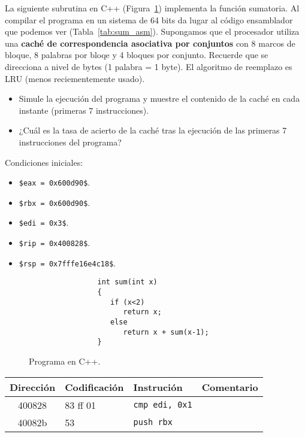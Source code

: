 \documentclass[12pt]{article}
\begin{document}
    \begin{ejercicio}[1.25 puntos]
        La siguiente subrutina en C++ (Figura~\ref{sum_c}) implementa la función sumatoria. Al compilar el programa en un sistema de 64 bits da lugar al código ensamblador que podemos ver (Tabla~\ref{tab:sum_asm}). Supongamos que el procesador utiliza una \textbf{caché de correspondencia asociativa por conjuntos} con 8 marcos de bloque, 8 palabras por bloqe y 4 bloques por conjunto. Recuerde que se direcciona a nivel de bytes (1 palabra = 1 byte). El algoritmo de reemplazo es LRU (menos reciementemente usado).
        \begin{itemize}
            \item Simule la ejecución del programa y muestre el contenido de la caché en cada instante (primeras 7 instrucciones).
            \item ¿Cuál es la tasa de acierto de la caché tras la ejecución de las primeras 7 instrucciones del programa?
        \end{itemize}
        Condiciones iniciales:
        \begin{itemize}
            \item \verb|$eax = 0x600d90$|.
            \item \verb|$rbx = 0x600d90$|.
            \item \verb|$edi = 0x3$|.
            \item \verb|$rip = 0x400828$|.
            \item \verb|$rsp = 0x7fffe16e4c18$|.
        \end{itemize}
        \begin{figure}[H]
            \begin{verbatim}
                int sum(int x)
                {
                   if (x<2)
                      return x;
                   else
                      return x + sum(x-1);
                }
            \end{verbatim}
            \caption{Programa en C++.}
            \label{sum_c}
        \end{figure}
        \begin{table}[H]
        \centering
        \begin{tabular}{|c|l|l|l|}
            \hline
            Dirección & Codificación & Instrución & Comentario \\
            \hline
            400828 & 83 ff 01 & \verb|cmp edi, 0x1| & \\
            \hline
            40082b & 53 & \verb|push rbx| & \\

\end{tabular}
\end{table}
\end{ejercicio}
\end{document}
